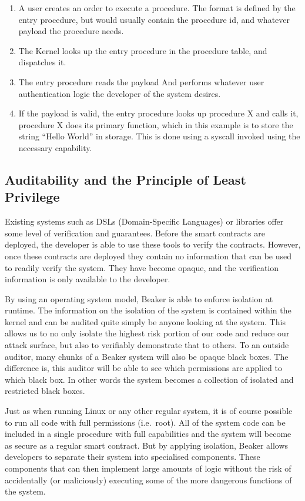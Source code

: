 \documentclass[english,a4paper]{article}
\begin{document}
\begin{enumerate}
\def\labelenumi{\arabic{enumi}.}
\item
  A user creates an order to execute a procedure. The format is defined
  by the entry procedure, but would usually contain the procedure id,
  and whatever payload the procedure needs.
\item
  The Kernel looks up the entry procedure in the procedure table, and
  dispatches it.
\item
  The entry procedure reads the payload And performs whatever user
  authentication logic the developer of the system desires.
\item
  If the payload is valid, the entry procedure looks up procedure X and
  calls it, procedure X does its primary function, which in this example
  is to store the string ``Hello World'' in storage. This is done using
  a syscall invoked using the necessary capability.
\end{enumerate}

\subsection{Auditability and the Principle of Least
Privilege}\label{auditability-and-the-principle-of-least-privilege}

Existing systems such as DSLs (Domain-Specific Languages) or libraries
offer some level of verification and guarantees. Before the smart
contracts are deployed, the developer is able to use these tools to
verify the contracts. However, once these contracts are deployed they
contain no information that can be used to readily verify the system.
They have become opaque, and the verification information is only
available to the developer.

By using an operating system model, Beaker is able to enforce isolation
at runtime. The information on the isolation of the system is contained
within the kernel and can be audited quite simply be anyone looking at
the system. This allows us to no only isolate the highest risk portion
of our code and reduce our attack surface, but also to verifiably
demonstrate that to others. To an outside auditor, many chunks of a
Beaker system will also be opaque black boxes. The difference is, this
auditor will be able to see which permissions are applied to which black
box. In other words the system becomes a collection of isolated and
restricted black boxes.

Just as when running Linux or any other regular system, it is of course
possible to run all code with full permissions (i.e.~root). All of the
system code can be included in a single procedure with full capabilities
and the system will become as secure as a regular smart contract. But by
applying isolation, Beaker allows developers to separate their system
into specialised components. These components that can then implement
large amounts of logic without the risk of accidentally (or maliciously)
executing some of the more dangerous functions of the system.
\end{document}
